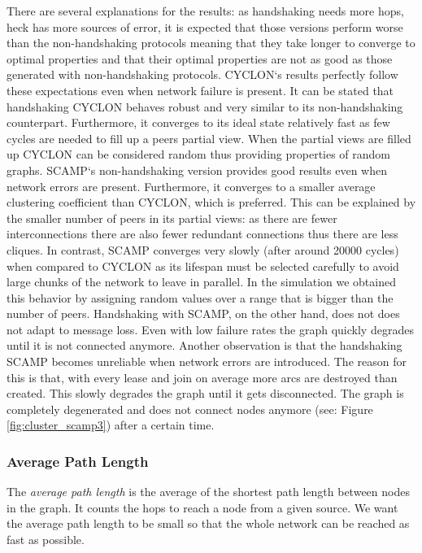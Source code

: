 \documentclass[11pt, english, screen]{report-rd-info}
\begin{document}
There are several explanations for the results: as handshaking needs more hops, heck has more sources of error, it is expected that those versions perform worse than the non-handshaking protocols meaning that they take longer to converge to optimal properties and that their optimal properties are not as good as those generated with non-handshaking protocols.
CYCLON`s results perfectly follow these expectations even when network failure is present.
It can be stated that handshaking CYCLON behaves robust and very similar to its non-handshaking counterpart.
Furthermore, it converges to its ideal state relatively fast as few cycles are needed to fill up a peers partial view.
When the partial views are filled up CYCLON can be considered random thus providing properties of random graphs. 
SCAMP`s non-handshaking version provides good results even when network errors are present.
Furthermore, it converges to a smaller average clustering coefficient than CYCLON, which is preferred.
This can be explained by the smaller number of peers in its partial views: as there are fewer interconnections there are also fewer redundant connections thus there are less cliques.
In contrast, SCAMP converges very slowly (after around 20000 cycles) when compared to CYCLON as its lifespan must be selected carefully to avoid large chunks of the network to leave in parallel. 
In the simulation we obtained this behavior by assigning random values over a range that is bigger than the number of peers.
Handshaking with SCAMP, on the other hand, does not does not adapt to message loss.
Even with low failure rates the graph quickly degrades until it is not connected anymore.
Another observation is that the handshaking SCAMP becomes unreliable when network errors are introduced.
The reason for this is that, with every lease and join on average more arcs are destroyed than created.
This slowly degrades the graph until it gets disconnected.
The graph is completely degenerated and does not connect nodes anymore (see: Figure \ref{fig:cluster_scamp3}) after a certain time.

\subsubsection{Average Path Length}

The \emph{average path length} is the average of the shortest path length between nodes in the graph.
It counts the hops to reach a node from a given source.
We want the average path length to be small so that the whole network can be reached as fast as possible.
\end{document}
